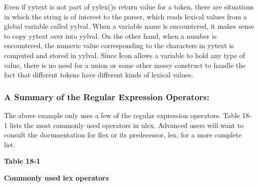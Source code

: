 Even if \textsf{yytext} is not part of
\textsf{yylex()}{\textquotesingle}s return value for a token, there are
situations in which the string is of interest to the parser, which
reads lexical values from a global variable called \textsf{yylval}.
When a variable name is encountered, it makes sense to copy
\textsf{yytext} over into \textsf{yylval}. On the other hand, when a
number is encountered, the numeric value corresponding to the
characters in \textsf{yytext} is computed and stored in
\textsf{yylval}. Since Icon allows a variable to hold any type of
value, there is no need for a union or some other messy construct to
handle the fact that different tokens have different kinds of lexical
values.

\subsubsection{A Summary of the Regular Expression Operators:}

The above example only uses a few of the regular expression operators.
Table 18-1 lists the most commonly used operators in \textsf{ulex}.
Advanced users will want to consult the documentation for \textsf{flex}
or its predecessor, \textsf{lex}, for a more complete list.

{\centering\sffamily\bfseries
Table 18-1
\par}

{\centering\sffamily\bfseries
Commonly used lex operators
\par}

